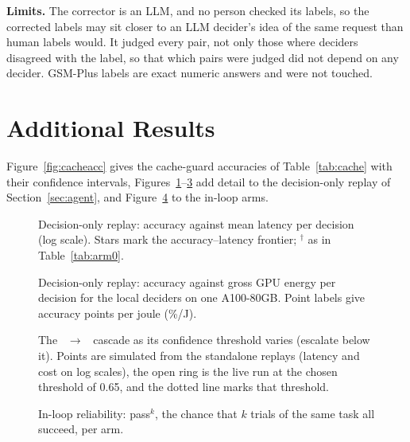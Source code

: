 \textbf{Limits.} The corrector is an LLM, and no person checked its labels, so the corrected labels may sit closer to an LLM decider's idea of the same request than human labels would.
It judged every pair, not only those where deciders disagreed with the label, so that which pairs were judged did not depend on any decider.
GSM-Plus labels are exact numeric answers and were not touched.

\section{Additional Results}
\label{app:results}

Figure~\ref{fig:cacheacc} gives the cache-guard accuracies of Table~\ref*{tab:cache} with their confidence intervals, Figures~\ref{fig:pareto}--\ref{fig:cascade} add detail to the decision-only replay of Section~\ref*{sec:agent}, and Figure~\ref{fig:passk} to the in-loop arms.


\begin{figure}[H]
\centering
{}
\caption{Decision-only replay: accuracy against mean latency per decision (log scale). Stars mark the accuracy--latency frontier; $^\dagger$ as in Table~\ref*{tab:arm0}.}
\label{fig:pareto}
\end{figure}

\begin{figure}[H]
\centering
{}
\caption{Decision-only replay: accuracy against gross GPU energy per decision for the local deciders on one A100-80GB. Point labels give accuracy points per joule (\%/J).}
\label{fig:energy}
\end{figure}

\begin{figure}[H]
\centering
{}
\caption{The \jev\ $\rightarrow$ \gbig\ cascade as its confidence threshold varies (escalate below it). Points are simulated from the standalone replays (latency and cost on log scales), the open ring is the live run at the chosen threshold of 0.65, and the dotted line marks that threshold.}
\label{fig:cascade}
\end{figure}

\begin{figure}[H]
\centering
{}
\caption{In-loop reliability: pass$^k$, the chance that $k$ trials of the same task all succeed, per arm.}
\label{fig:passk}
\end{figure}
